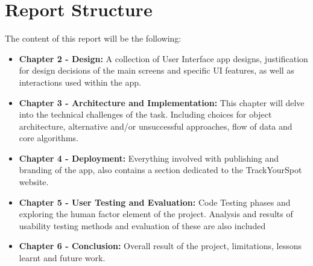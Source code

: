 \section{Report Structure}
The content of this report will be the following:
\begin{itemize}
    \item \textbf{Chapter 2 - Design: } A collection of User Interface app designs, justification for design decisions of the main screens and specific UI features, as well as interactions used within the app.
    \item \textbf{Chapter 3 - Architecture and Implementation: }This chapter will delve into the technical challenges of the task. Including choices for object architecture, alternative and/or unsuccessful approaches, flow of data and core algorithms.
    \item \textbf{Chapter 4 - Deployment: }Everything involved with publishing and branding of the app, also contains a section dedicated to the TrackYourSpot website.
    \item \textbf{Chapter 5 - User Testing and Evaluation: } Code Testing phases and exploring the human factor element of the project. Analysis and results of usability testing methods and evaluation of these are also included
    \item \textbf{Chapter 6 - Conclusion: }Overall result of the project, limitations, lessons learnt and future work.
\end{itemize}